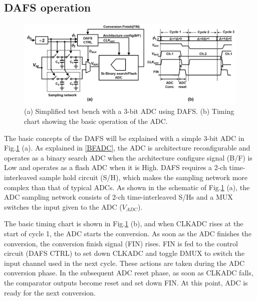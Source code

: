 \subsection{DAFS operation}

\begin{figure}
\centering
  \includegraphics[width=1\textwidth]{figure/chap3/fig4.jpg}
  \caption{(a) Simplified test bench with a 3-bit ADC using DAFS. (b) Timing chart showing the basic operation of the ADC.}
  \label{fig-3-4}
\end{figure}

The basic concepts of the DAFS will be explained with a simple 3-bit ADC in Fig.\ref{fig-3-4} (a). As explained in \ref{BFADC}, the ADC is architecture reconfigurable and operates as a binary search ADC when the architecture configure signal (B/F) is Low and operates as a flash ADC when it is High. DAFS requires a 2-ch time-interleaved sample hold circuit (S/H), which makes the sampling network more complex than that of typical ADCs. As shown in the schematic of Fig.\ref{fig-3-4} (a), the ADC sampling network consists of 2-ch time-interleaved S/Hs and a MUX switches the input given to the ADC ($V_{ADC}$).

The basic timing chart is shown in Fig.\ref{fig-3-4} (b), and when CLKADC rises at the start of cycle 1, the ADC starts the conversion. As soon as the ADC finishes the conversion, the conversion finish signal (FIN) rises. FIN is fed to the control circuit (DAFS CTRL) to set down CLKADC and toggle DMUX to switch the input channel used in the next cycle. These actions are taken during the ADC conversion phase. In the subsequent ADC reset phase, as soon as CLKADC falls, the comparator outputs become reset and set down FIN. At this point, ADC is ready for the next conversion. 

